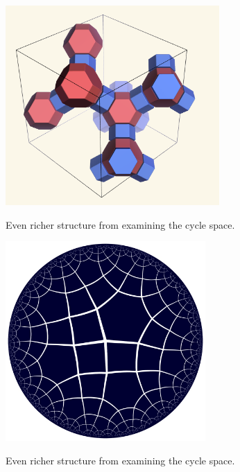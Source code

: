 \documentclass{beamer}
\begin{document}
\begin{frame}
  \begin{center}
    \includegraphics[height=3in]{fau-cages-new}

    Even richer structure from examining the cycle space.
  \end{center}
\end{frame}

\begin{frame}
  \begin{center}
    \includegraphics[height=3in]{hqc0576}

    Even richer structure from examining the cycle space.
  \end{center}
\end{frame}
\end{document}
